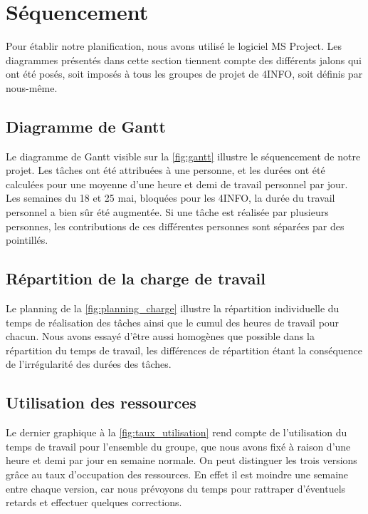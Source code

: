 \section{Séquencement}
	\label{sec:sequencement}
	Pour établir notre planification, nous avons utilisé le logiciel MS Project. Les diagrammes présentés dans cette section tiennent compte des différents jalons qui ont été posés, soit imposés à tous les groupes de projet de 4INFO, soit définis par nous-même.

	\subsection{Diagramme de Gantt}
		Le diagramme de Gantt visible sur la \ffigure{} \ref{fig:gantt} illustre le séquencement de notre projet. Les tâches ont été attribuées à une personne, et les durées ont été calculées pour une moyenne d'une heure et demi de travail personnel par jour. Les semaines du 18 et 25 mai, bloquées pour les 4INFO, la durée du travail personnel a bien sûr été augmentée. Si une tâche est réalisée par plusieurs personnes, les contributions de ces différentes personnes sont séparées par des pointillés.  
	
	\subsection{Répartition de la charge de travail}
		Le planning de la \ffigure{} \ref{fig:planning_charge} illustre la répartition individuelle du temps de réalisation des tâches ainsi que le cumul des heures de travail pour chacun. Nous avons essayé d'être aussi homogènes que possible dans la répartition du temps de travail, les différences de répartition étant la conséquence de l'irrégularité des durées des tâches.

	\subsection{Utilisation des ressources}
		Le dernier graphique à la \ffigure{} \ref{fig:taux_utilisation} rend compte de l'utilisation du temps de travail pour l'ensemble du groupe, que nous avons fixé à raison d'une heure et demi par jour en semaine normale. On peut distinguer les trois versions grâce au taux d'occupation des ressources. En effet il est moindre une semaine entre chaque version, car nous prévoyons du temps pour rattraper d'éventuels retards et effectuer quelques corrections.

